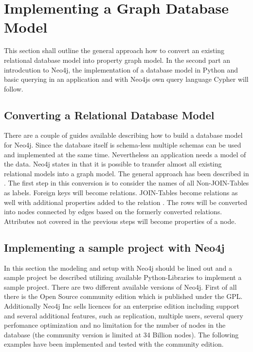 \section{Implementing a Graph Database Model}
This section shall outline the general approach how to convert an existing relational database model into property graph model.
In the second part an introdcution to Neo4j, the implementation of a database model in Python and basic querying in an application and with Neo4js own query language \glqq Cypher\grqq{} will follow.

\subsection{Converting a Relational Database Model}
There are a couple of guides available describing how to build a database model for Neo4j. Since the database itself is schema-less multiple schemas can be used and implemented at the same time.
Nevertheless an application needs a model of the data.
Neo4j states in \autocite{neo4j:rel_to_graph} that it is possible to transfer almost all existing relational models into a graph model.
The general approach has been described in \autocite{dzone:rel_to_graph}.
The first step in this conversion is to consider the names of all Non-JOIN-Tables as labels.
Foreign keys will become relations.
JOIN-Tables become relations as well with additional properties added to the relation \autocite{neo4j:graph_vs_rdbms}.
The rows will be converted into nodes connected by edges based on the formerly converted relations. Attributes not covered in the previous steps will become properties of a node.

\subsection{Implementing a sample project with Neo4j}
In this section the modeling and setup with Neo4j should be lined out and a sample project be described utilizing available Python-Libraries to implement a sample project.
There are two different available versions of Neo4j.
First of all there is the Open Source community edition which is published under the GPL.
Additionally Neo4j Inc sells licences for an enterprise edition \autocite{neo4j:editions} including support and several additional features, such as replication, multiple users, several query perfomance optimization and no limitation for the number of nodes in the database (the community version is limited at 34 Billion nodes).
The following examples have been implemented and tested with the community edition.

